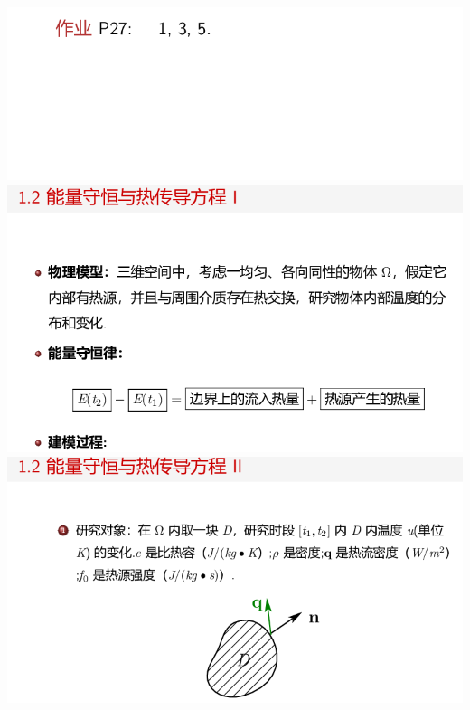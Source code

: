 \documentclass[11pt,a4paper]{ctexart}
\begin{document}
\begin{paracol}{2}
\includegraphics[width=\linewidth]{chap01_27.png}
\includegraphics[width=\linewidth]{chap01_28.png}
\includegraphics[width=\linewidth]{chap01_29.png}
\newpage


\end{paracol}
\end{document}
